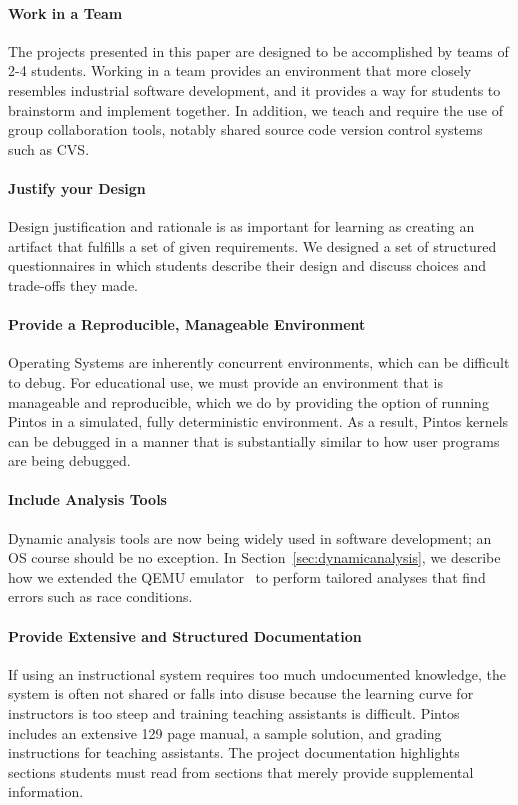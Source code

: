 \paragraph{Work in a Team}
The projects presented in this paper are designed to be accomplished by teams of 
2-4 students.  Working in a team provides an environment that more closely resembles
industrial software development, and it provides a way for students to brainstorm and
implement together.  In addition, we teach and require the use of group collaboration tools,
notably shared source code version control systems such as CVS.

\paragraph{Justify your Design}
Design justification and rationale is as important for learning as creating an artifact 
that fulfills a set of given requirements.  We designed a set of structured questionnaires 
in which students describe their design and discuss choices and trade-offs they made.

\paragraph{Provide a Reproducible, Manageable Environment}
Operating Systems are inherently concurrent environments, which can be difficult
to debug.  For educational use, we must provide an environment that is
manageable and reproducible, which we do by providing the option
of running Pintos in a simulated, fully deterministic environment.  
As a result, Pintos kernels can be debugged in a manner that
is substantially similar to how user programs are being debugged.

\paragraph{Include Analysis Tools}
Dynamic analysis tools are now being widely used in software development; 
an OS course should be no exception.  
In Section~\ref{sec:dynamicanalysis}, we describe how we 
extended the QEMU emulator~\cite{Bellard2005QEMU} to 
perform tailored analyses that find errors such as race conditions.

\paragraph{Provide Extensive and Structured Documentation}
If using an instructional system requires too much undocumented knowledge,
the system is often not shared or falls into disuse because the learning curve
for instructors is too steep and training teaching assistants is difficult.
Pintos includes an extensive 129 page manual, a sample solution,
and grading instructions for teaching assistants.  The project documentation 
highlights sections students must read from sections that merely provide supplemental information.

